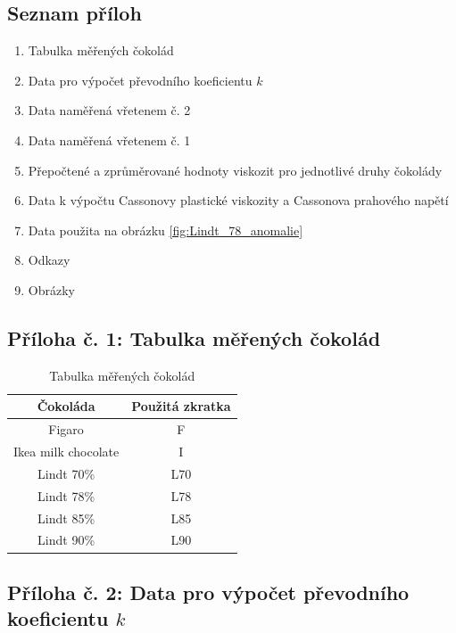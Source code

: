 \documentclass[12pt]{article}
\begin{document}
\subsection*{Seznam příloh}
\begin{enumerate}[noitemsep, topsep = 0pt]
    \item Tabulka měřených čokolád
    \item Data pro výpočet převodního koeficientu $k$
    \item Data naměřená vřetenem č. 2
    \item Data naměřená vřetenem č. 1
    \item Přepočtené a zprůměrované hodnoty viskozit pro jednotlivé druhy čokolády
    \item Data k výpočtu Cassonovy plastické viskozity a Cassonova prahového napětí
    \item Data použita na obrázku \ref{fig:Lindt_78_anomalie}
    \item Odkazy
    \item Obrázky
\end{enumerate}


\newpage
\subsection*{Příloha č. 1: Tabulka měřených čokolád}

\begin{table}[!h]
    \centering
    \begin{NiceTabular}{|c|c|}
        \hline
        Čokoláda & Použitá zkratka \\ \hline\hline
        Figaro & F \\ \hline
        Ikea milk chocolate & I \\ \hline
        Lindt 70\% & L70 \\ \hline
        Lindt 78\% & L78 \\ \hline
        Lindt 85\% & L85 \\ \hline
        Lindt 90\% & L90 \\      
        \hline
    \end{NiceTabular}
    \caption{Tabulka měřených čokolád}
    \label{tab:cokolady}
\end{table} %

\subsection*{Příloha č. 2: Data pro výpočet převodního koeficientu $k$}
\end{document}

